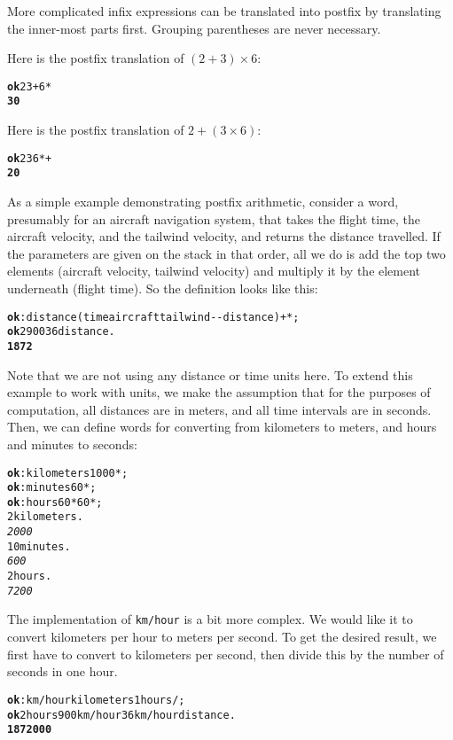 \documentclass[english]{book}
\begin{document}
More complicated infix expressions can be translated into postfix
by translating the inner-most parts first. Grouping parentheses are
never necessary.

Here is the postfix translation of $(2 + 3) \times 6$:

\begin{alltt}
\textbf{ok} 2 3 + 6 {*}
\textbf{30}
\end{alltt}

Here is the postfix translation of $2 + (3 \times 6)$:

\begin{alltt}
\textbf{ok} 2 3 6 {*} +
\textbf{20}
\end{alltt}

As a simple example demonstrating postfix arithmetic, consider a word, presumably for an aircraft navigation system, that takes the flight time, the aircraft
velocity, and the tailwind velocity, and returns the distance travelled.
If the parameters are given on the stack in that order, all we do
is add the top two elements (aircraft velocity, tailwind velocity)
and multiply it by the element underneath (flight time). So the definition
looks like this:

\begin{alltt}
\textbf{ok} : distance ( time aircraft tailwind -{}- distance ) + {*} ;
\textbf{ok} 2 900 36 distance .
\textbf{1872}
\end{alltt}

Note that we are not using any distance or time units here. To extend this example to work with units, we make the assumption that for the purposes of computation, all distances are
in meters, and all time intervals are in seconds. Then, we can define words
for converting from kilometers to meters, and hours and minutes to
seconds:

\begin{alltt}
\textbf{ok} : kilometers 1000 {*} ;
\textbf{ok} : minutes 60 {*} ;
\textbf{ok} : hours 60 {*} 60 {*} ;
2 kilometers .
\emph{2000}
10 minutes .
\emph{600}
2 hours .
\emph{7200}
\end{alltt}

The implementation of \texttt{km/hour} is a bit more complex. We would like it to convert kilometers per hour to meters per second. To get the desired result, we first have to convert to kilometers per second, then divide this by the number of seconds in one hour.

\begin{alltt}
\textbf{ok} : km/hour kilometers 1 hours / ;
\textbf{ok} 2 hours 900 km/hour 36 km/hour distance .
\textbf{1872000}
\end{alltt}
\end{document}
